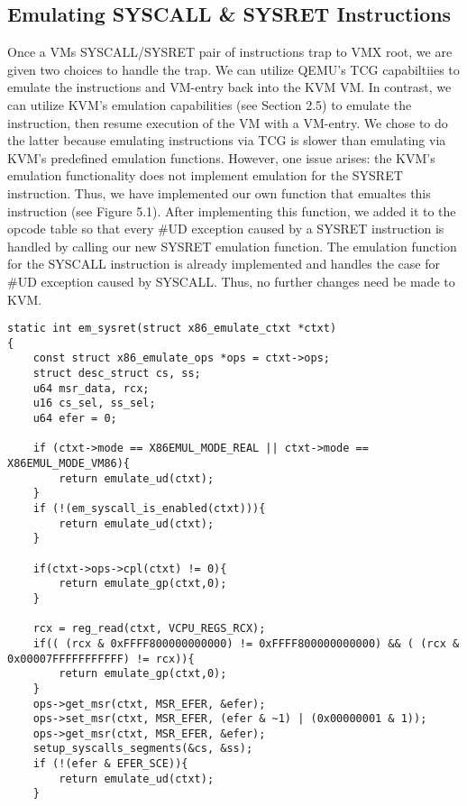 \documentclass{report}
\begin{document}
\begin{spacing}{1.5}
\subsection{Emulating SYSCALL \& SYSRET Instructions}

{\large
Once a VMs SYSCALL/SYSRET pair of instructions trap to VMX root, we are given two choices to handle the trap. We can utilize QEMU's TCG capabiltiies to emulate the instructions and VM-entry back into the KVM VM. In contrast, we can utilize KVM's emulation capabilities (see Section 2.5) to emulate the instruction, then resume execution of the VM with a VM-entry. We chose to do the latter because emulating instructions via TCG is slower than emulating via KVM's predefined emulation functions. However, one issue arises: the KVM's emulation functionality does not implement emulation for the SYSRET instruction. Thus, we have implemented our own function that emualtes this instruction (see Figure 5.1). After implementing this function, we added it to the opcode table so that every \#UD exception caused by a SYSRET instruction is handled by calling our new SYSRET emulation function. The emulation function for the SYSCALL instruction is already implemented and handles the case for \#UD exception caused by SYSCALL. Thus, no further changes need be made to KVM. 
\newline
}











\begin{lstlisting}[caption={Emulation of SYSRET instruction},captionpos=b]
static int em_sysret(struct x86_emulate_ctxt *ctxt)
{
    const struct x86_emulate_ops *ops = ctxt->ops;
    struct desc_struct cs, ss;
    u64 msr_data, rcx;
    u16 cs_sel, ss_sel;
    u64 efer = 0;

    if (ctxt->mode == X86EMUL_MODE_REAL || ctxt->mode == X86EMUL_MODE_VM86){
        return emulate_ud(ctxt);
    }
    if (!(em_syscall_is_enabled(ctxt))){
        return emulate_ud(ctxt);
    }
    
    if(ctxt->ops->cpl(ctxt) != 0){
        return emulate_gp(ctxt,0);
    }
    
    rcx = reg_read(ctxt, VCPU_REGS_RCX);
    if(( (rcx & 0xFFFF800000000000) != 0xFFFF800000000000) && ( (rcx & 0x00007FFFFFFFFFFF) != rcx)){
        return emulate_gp(ctxt,0);
    }
    ops->get_msr(ctxt, MSR_EFER, &efer);
    ops->set_msr(ctxt, MSR_EFER, (efer & ~1) | (0x00000001 & 1));
    ops->get_msr(ctxt, MSR_EFER, &efer);
    setup_syscalls_segments(&cs, &ss);
    if (!(efer & EFER_SCE)){
        return emulate_ud(ctxt);
    }


\end{lstlisting}
\end{spacing}
\end{document}

